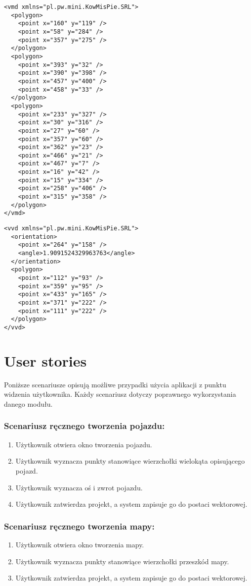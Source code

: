 \documentclass{article}
\let\oldsection\section
\renewcommand\section{\clearpage\oldsection} %
\begin{document}
\begin{lstlisting}
<vmd xmlns="pl.pw.mini.KowMisPie.SRL">
  <polygon>
    <point x="160" y="119" />
    <point x="58" y="284" />
    <point x="357" y="275" />
  </polygon>
  <polygon>
    <point x="393" y="32" />
    <point x="390" y="398" />
    <point x="457" y="400" />
    <point x="458" y="33" />
  </polygon>
  <polygon>
    <point x="233" y="327" />
    <point x="30" y="316" />
    <point x="27" y="60" />
    <point x="357" y="60" />
    <point x="362" y="23" />
    <point x="466" y="21" />
    <point x="467" y="7" />
    <point x="16" y="42" />
    <point x="15" y="334" />
    <point x="258" y="406" />
    <point x="315" y="358" />
  </polygon>
</vmd>
\end{lstlisting}

\begin{lstlisting}
<vvd xmlns="pl.pw.mini.KowMisPie.SRL">
  <orientation>
    <point x="264" y="158" />
    <angle>1.9091524329963763</angle>
  </orientation>
  <polygon>
    <point x="112" y="93" />
    <point x="359" y="95" />
    <point x="433" y="165" />
    <point x="371" y="222" />
    <point x="111" y="222" />
  </polygon>
</vvd>
\end{lstlisting}

\section{User stories}

Poniższe scenariusze opisują możliwe przypadki użycia aplikacji z punktu widzenia użytkownika. Każdy scenariusz dotyczy poprawnego wykorzystania danego modułu.

\subsubsection{Scenariusz ręcznego tworzenia pojazdu:}
\begin{enumerate}
  \item Użytkownik otwiera okno tworzenia pojazdu.
  \item Użytkownik wyznacza punkty stanowiące wierzchołki wielokąta opisującego pojazd.
  \item Użytkownik wyznacza oś i zwrot pojazdu.
  \item Użytkownik zatwierdza projekt, a system zapisuje go do postaci wektorowej.
\end{enumerate}

\subsubsection{Scenariusz ręcznego tworzenia mapy:}
\begin{enumerate}
  \item Użytkownik otwiera okno tworzenia mapy.
  \item Użytkownik wyznacza punkty stanowiące wierzchołki przeszkód mapy.
  \item Użytkownik zatwierdza projekt, a system zapisuje go do postaci wektorowej.
\end{enumerate}
\end{document}
